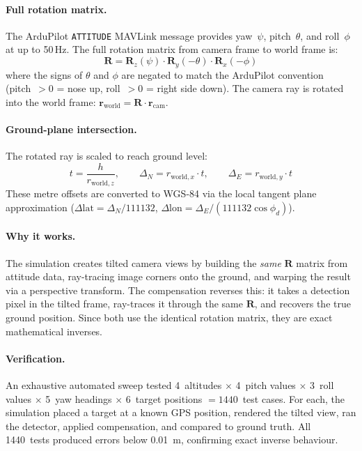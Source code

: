 \documentclass[10pt,a4paper]{article}
\begin{document}
\paragraph{Full rotation matrix.}
The ArduPilot \texttt{ATTITUDE} MAVLink message provides yaw~$\psi$, pitch~$\theta$, and roll~$\phi$ at up to 50\,Hz.  The full rotation matrix from camera frame to world frame is:
%
\begin{equation}\label{eq:cv-full-rotation}
  \mathbf{R} = \mathbf{R}_z(\psi) \cdot \mathbf{R}_y(-\theta) \cdot \mathbf{R}_x(-\phi)
\end{equation}
%
\noindent where the signs of $\theta$ and $\phi$ are negated to match the ArduPilot convention (pitch~$> 0$ = nose up, roll~$> 0$ = right side down).  The camera ray is rotated into the world frame: $\mathbf{r}_\mathrm{world} = \mathbf{R} \cdot \mathbf{r}_\mathrm{cam}$.

\paragraph{Ground-plane intersection.}
The rotated ray is scaled to reach ground level:
%
\begin{equation}\label{eq:cv-ground-intersect}
  t = \frac{h}{r_{\mathrm{world},z}}, \qquad
  \Delta_N = r_{\mathrm{world},x} \cdot t, \qquad
  \Delta_E = r_{\mathrm{world},y} \cdot t
\end{equation}
%
\noindent These metre offsets are converted to WGS-84 via the local tangent plane approximation ($\Delta\mathrm{lat} = \Delta_N / 111132$, $\Delta\mathrm{lon} = \Delta_E / (111132 \cos\phi_d)$).

\paragraph{Why it works.}
The simulation creates tilted camera views by building the \emph{same} $\mathbf{R}$ matrix from attitude data, ray-tracing image corners onto the ground, and warping the result via a perspective transform.  The compensation reverses this: it takes a detection pixel in the tilted frame, ray-traces it through the same $\mathbf{R}$, and recovers the true ground position.  Since both use the identical rotation matrix, they are exact mathematical inverses.

\paragraph{Verification.}
An exhaustive automated sweep tested 4~altitudes $\times$ 4~pitch values $\times$ 3~roll values $\times$ 5~yaw headings $\times$ 6~target positions $= 1440$~test cases.  For each, the simulation placed a target at a known GPS position, rendered the tilted view, ran the detector, applied compensation, and compared to ground truth.  All 1440~tests produced errors below \SI{0.01}{\metre}, confirming exact inverse behaviour.
\end{document}
